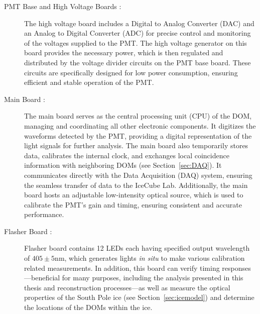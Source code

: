 \begin{description}
    \item[PMT Base and High Voltage Boards :] The high voltage board includes a Digital to Analog Converter (DAC) and an Analog to Digital Converter (ADC) for precise control and monitoring of the voltages supplied to the PMT. The high voltage generator on this board provides the necessary power, which is then regulated and distributed by the voltage divider circuits on the PMT base board. These circuits are specifically designed for low power consumption, ensuring efficient and stable operation of the PMT.
    
    \item[Main Board :] The main board serves as the central processing unit (CPU) of the DOM, managing and coordinating all other electronic components. It digitizes the waveforms detected by the PMT, providing a digital representation of the light signals for further analysis. The main board also temporarily stores data, calibrates the internal clock, and exchanges local coincidence information with neighboring DOMs (see Section~\ref{sec:DAQ}). It communicates directly with the Data Acquisition (DAQ) system, ensuring the seamless transfer of data to the IceCube Lab. Additionally, the main board hosts an adjustable low-intensity optical source, which is used to calibrate the PMT's gain and timing, ensuring consistent and accurate performance.
    
    \item[Flasher Board :] Flasher board contains 12 LEDs each having specified output wavelength of $405\pm5 \mathrm{nm}$,
        which generates lights \emph{in situ} to make various calibration related measurements. In addition, this board can verify timing responses—beneficial for many purposes, including the analysis presented in this thesis and reconstruction processes—as well as measure the optical properties of the South Pole ice (see Section~\ref{sec:icemodel}) and determine the locations of the DOMs within the ice.
    
\end{description}

